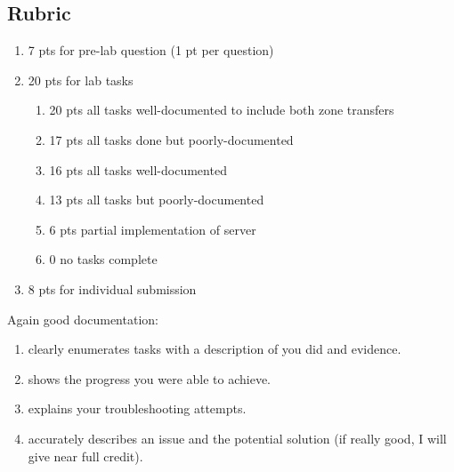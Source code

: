 \documentclass{article}
\begin{document}
\subsection{Rubric}

\begin{enumerate}
    \item 7 pts for pre-lab question (1 pt per question)
    \item 20 pts for lab tasks 
    \begin{enumerate}
        \item 20 pts all tasks well-documented to include both zone transfers
        \item 17 pts all tasks done but  poorly-documented
        \item 16 pts all \ubuntu tasks  well-documented
        \item 13 pts all \ubuntu tasks but  poorly-documented
        \item 6 pts partial implementation of  \ubuntu server
        \item 0 no tasks complete
    \end{enumerate}
    \item 8 pts for individual submission
\end{enumerate}

Again good documentation: 
\begin{enumerate}
\item clearly enumerates tasks with a description of you did and evidence.
\item shows the progress you were able to achieve.
\item explains your troubleshooting attempts.
\item accurately describes an issue and the potential solution (if really good, I will give near full credit).
\end{enumerate}
\end{document}
